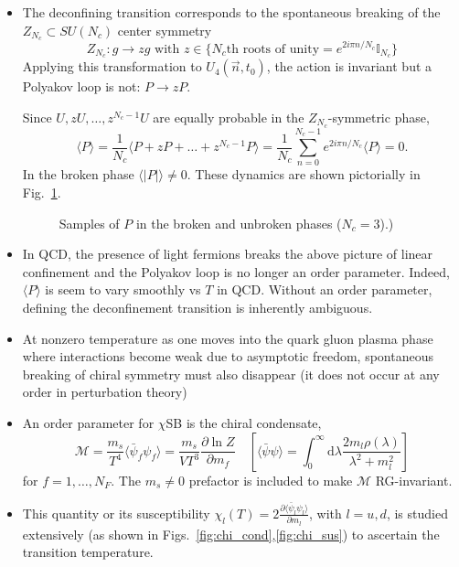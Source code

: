 \begin{itemize}
    \item The deconfining transition corresponds to the spontaneous breaking of the $Z_{N_c}\subset SU(N_c)$ center symmetry
\begin{equation}
    Z_{N_c} : g \rightarrow z g \text{ with } z \in \{N_c\text{th roots of unity} = e^{2 i \pi n/N_c} \mathbb{I}_{N_c} \}
\end{equation}
Applying this transformation to $U_4(\vec{n}, t_0)$, the action is invariant but a Polyakov loop is not: $P \rightarrow z P$.

Since $U, zU, \ldots, z^{N_c - 1}U$ are equally probable in the $Z_{N_c}$-symmetric phase,
\begin{equation}
    \langle P \rangle = \frac{1}{N_c}\langle P + z P + \ldots + z^{N_c - 1} P \rangle = \frac{1}{N_c} \sum_{n = 0}^{N_c - 1}e^{2 i \pi n /N_c}\langle P \rangle = 0.
\end{equation}
In the broken phase $\langle|P|\rangle \neq 0$.
%
These dynamics are shown pictorially in Fig.~\ref{fig:roots_of_unity}.
%
\begin{figure}
    \centering
    \caption{Samples of $P$ in the broken and unbroken phases ($N_c = 3$).)}
    \label{fig:roots_of_unity}
\end{figure}

    \item In QCD, the presence of light fermions breaks the above picture of linear confinement and the Polyakov loop is no longer an order parameter. Indeed, $\langle P \rangle$ is seem to vary smoothly vs $T$ in QCD. Without an order parameter, defining the deconfinement transition is inherently ambiguous.
    \item At nonzero temperature as one moves into the quark gluon plasma phase where interactions become weak due to asymptotic freedom, spontaneous breaking of chiral symmetry must also disappear (it does not occur at any order in perturbation theory)
    \item An order parameter for $\chi$SB is the chiral condensate,
\begin{equation}
    \mathcal{M} = \frac{m_s}{T^4} \langle \bar{\psi}_f \psi_f \rangle = \frac{m_s}{V T^3}\frac{\partial \ln Z}{\partial m_f} \quad \left[\langle\bar{\psi}\psi\rangle = \int_0^\infty \text{d}\lambda \frac{2 m_l \rho(\lambda)}{\lambda^2 + m_l^2}\right]
\end{equation}
for $f = 1, \ldots, N_F$. The $m_s \neq 0$ prefactor is included to make $\mathcal{M}$ RG-invariant.
    \item This quantity or its susceptibility $\chi_l(T) = 2 \frac{\partial \langle \bar{\psi}_l \psi_l \rangle}{\partial m_l}$, with $l = u,d$, is studied extensively (as shown in Figs.~\ref{fig:chi_cond},\ref{fig:chi_sus}) to ascertain the transition temperature.
\end{itemize}

